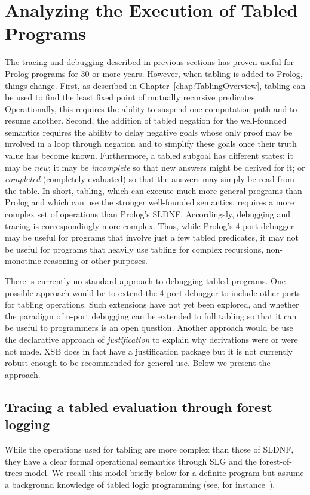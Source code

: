 \section{Analyzing the Execution of Tabled Programs} \label{sec:forest-trace}
%
The tracing and debugging described in previous sections has proven
useful for Prolog programs for 30 or more years.  However, when
tabling is added to Prolog, things change.  First, as described in
Chapter~\ref{chap:TablingOverview}, tabling can be used to find the
least fixed point of mutually recursive predicates.  Operationally,
this requires the ability to suspend one computation path and to
resume another.  Second, the addition of tabled negation for the
well-founded semantics requires the ability to delay negative goals
whose only proof may be involved in a loop through negation and to
simplify these goals once their truth value has become
known. Furthermore, a tabled subgoal has different states: it may be
{\em new}; it may be {\em incomplete} so that new answers might be
derived for it; or {\em completed} (completely evaluated) so that the
answers may simply be read from the table.  In short, tabling, which
can execute much more general programs than Prolog and which can use
the stronger well-founded semantics, requires a more complex set of
operations than Prolog's SLDNF.  Accordingsly, debugging and tracing
is correspondingly more complex.  Thus, while Prolog's 4-port debugger
may be useful for programs that involve just a few tabled predicates,
it may not be useful for programs that heavily use tabling for complex
recursions, non-monotinic reasoning or other purposes.

There is currently no standard approach to debugging tabled programs.
One possible approach would be to extend the 4-port debugger to
include other ports for tabling operations.  Such extensions have not
yet been explored, and whether the paradigm of n-port debugging can be
extended to full tabling so that it can be useful to programmers is an
open question.  Another approach would be use the declarative approach
of {\em justification} \cite{GuRR01,PGDRR04} to explain why
derivations were or were not made.  XSB does in fact have a
justification package but it is not currently robust enough to be
recommended for general use.  Below we present the {\tt \ctrace}
approach.

\subsection{Tracing a tabled evaluation through forest logging}
%
While the operations used for tabling are more complex than those of
SLDNF, they have a clear formal operational semantics through SLG and
the forest-of-trees model.  We recall this model briefly below for a
definite program but assume a background knowledge of tabled logic
programming (see, for instance~\cite{SwiW10}).

